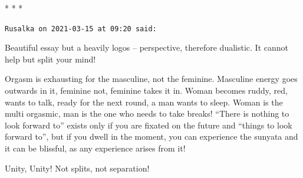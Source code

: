\begin{center}* * *\end{center}

\begin{footnotesize}
\begin{sffamily}
\texttt{Rusalka on 2021-03-15 at 09:20 said:}

Beautiful essay but a heavily logos -- perspective, therefore dualistic. It cannot help but split your mind!

Orgasm is exhausting for the masculine, not the feminine. Masculine energy goes outwards in it, feminine not, feminine takes it in. Woman becomes ruddy, red, wants to talk, ready for the next round, a man wants to sleep. Woman is the multi orgasmic, man is the one who needs to take breaks! ``There is nothing to look forward to'' exists only if you are fixated on the future and ``things to look forward to'', but if you dwell in the moment, you can experience the sunyata and it can be blissful, as any experience arises from it!

Unity, Unity! Not splits, not separation!

\end{sffamily}
\end{footnotesize}

